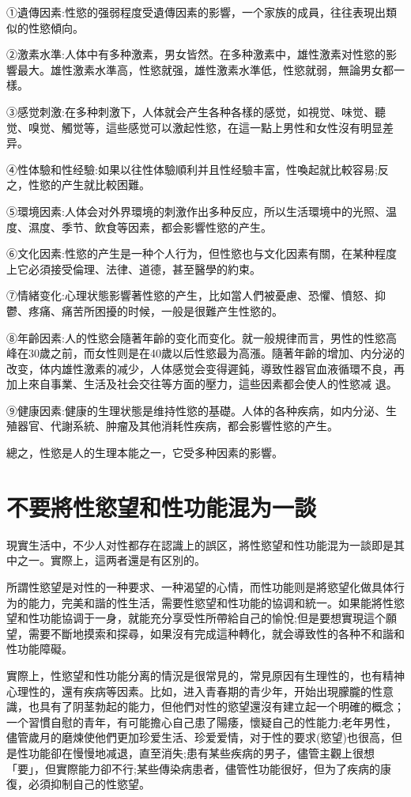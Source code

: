 \documentclass[12pt,UTF8]{ctexbook}
\begin{document}
①遺傳因素:性慾的强弱程度受遺傳因素的影響，一个家族的成員，往往表現出類似的性慾傾向。

②激素水準:人体中有多种激素，男女皆然。在多种激素中，雄性激素对性慾的影響最大。雄性激素水準高，性慾就强，雄性激素水準低，性慾就弱，無論男女都一樣。

③感觉刺激:在多种刺激下，人体就会产生各种各樣的感觉，如視觉、味觉、聽觉、嗅觉、觸觉等，這些感觉可以激起性慾，在這一點上男性和女性沒有明显差异。

④性体驗和性经驗:如果以往性体驗順利并且性经驗丰富，性喚起就比較容易;反之，性慾的产生就比較困難。

⑤環境因素:人体会对外界環境的刺激作出多种反应，所以生活環境中的光照、温度、濕度、季节、飲食等因素，都会影響性慾的产生。

⑥文化因素:性慾的产生是一种个人行为，但性慾也与文化因素有關，在某种程度上它必須接受倫理、法律、道德，甚至醫學的約束。

⑦情緒变化:心理状態影響著性慾的产生，比如當人們被憂慮、恐懼、憤怒、抑鬱、疼痛、痛苦所困擾的时候，一般是很難产生性慾的。

⑧年齡因素:人的性慾会隨著年齡的变化而变化。就一般規律而言，男性的性慾高峰在30歲之前，而女性则是在40歲以后性慾最为高漲。隨著年齡的增加、内分泌的改变，体内雄性激素的减少，人体感觉会变得遲鈍，導致性器官血液循環不良，再加上來自事業、生活及社会交往等方面的壓力，這些因素都会使人的性慾减
退。

⑨健康因素:健康的生理状態是维持性慾的基礎。人体的各种疾病，如内分泌、生殖器官、代謝系統、肿瘤及其他消耗性疾病，都会影響性慾的产生。

總之，性慾是人的生理本能之一，它受多种因素的影響。

\section{不要將性慾望和性功能混为一談}

現實生活中，不少人对性都存在認識上的誤区，將性慾望和性功能混为一談即是其中之一。實際上，這两者還是有区別的。

所謂性慾望是对性的一种要求、一种渴望的心情，而性功能则是將慾望化做具体行为的能力，完美和諧的性生活，需要性慾望和性功能的協调和統一。如果能將性慾望和性功能協调于一身，就能充分享受性所帶給自己的愉悅;但是要想實現這个願望，需要不斷地摸索和探尋，如果沒有完成這种轉化，就会導致性的各种不和諧和性功能障礙。

實際上，性慾望和性功能分离的情況是很常見的，常見原因有生理性的，也有精神心理性的，還有疾病等因素。比如，进入青春期的青少年，开始出現朦朧的性意識，也具有了阴茎勃起的能力，但他們对性的慾望還沒有建立起一个明確的概念；一个習慣自慰的青年，有可能擔心自己患了陽痿，懷疑自己的性能力;老年男性，儘管歲月的磨煉使他們更加珍爱生活、珍爱爱情，对于性的要求(慾望)也很高，但是性功能卻在慢慢地减退，直至消失;患有某些疾病的男子，儘管主觀上很想「要」，但實際能力卻不行;某些傳染病患者，儘管性功能很好，但为了疾病的康復，必須抑制自己的性慾望。
\end{document}
